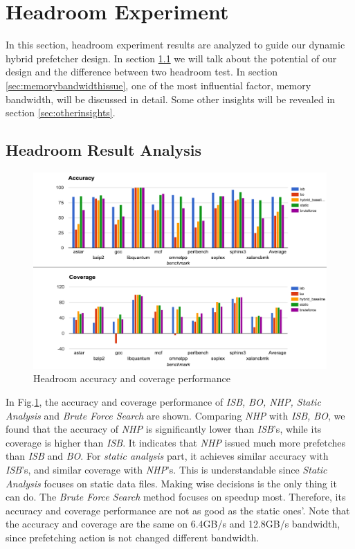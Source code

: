 \section{Headroom Experiment}
\label{sec:headroom}
In this section, headroom experiment results are analyzed to guide our dynamic hybrid prefetcher design. In section \ref{sec:headroomanalysis} we will talk about the potential of our design and the difference between two headroom test. In section \ref{sec:memorybandwidthissue}, one of the most influential factor, memory bandwidth, will be discussed in detail. Some other insights will be revealed in section \ref{sec:otherinsights}.

  \subsection{Headroom Result Analysis}
  \label{sec:headroomanalysis}

  \begin{figure}[ht!]
	   \centering
	   \includegraphics[width=1.0\textwidth]{images/headroom_acc_cov.png}
	   \caption{Headroom accuracy and coverage performance}
	  \label{fig:headroom_acc_cov}
  \end{figure}

  In Fig.\ref{fig:headroom_acc_cov}, the accuracy and coverage performance of \emph{ISB, BO, NHP, Static Analysis} and \emph{Brute Force Search} are shown. Comparing \emph{NHP} with \emph{ISB, BO}, we found that the accuracy of \emph{NHP} is significantly lower than \emph{ISB}'s, while its coverage is higher than \emph{ISB}. It indicates that \emph{NHP} issued much more prefetches than \emph{ISB} and \emph{BO}. For \emph{static analysis} part, it achieves similar accuracy with \emph{ISB}'s, and similar coverage with \emph{NHP}'s. This is understandable since \emph{Static Analysis} focuses on static data files. Making wise decisions is the only thing it can do. The \emph{Brute Force Search} method focuses on speedup most. Therefore, its accuracy and coverage performance are not as good as the static ones'. Note that the accuracy and coverage are the same on 6.4GB/s and 12.8GB/s bandwidth, since prefetching action is not changed different bandwidth.

